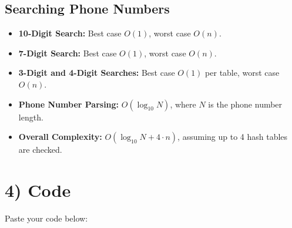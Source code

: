 \documentclass{article}
\begin{document}
\subsection*{Searching Phone Numbers}
\begin{itemize}
    \item \textbf{10-Digit Search:} Best case \(O(1)\), worst case \(O(n)\).
    \item \textbf{7-Digit Search:} Best case \(O(1)\), worst case \(O(n)\).
    \item \textbf{3-Digit and 4-Digit Searches:} Best case \(O(1)\) per table, worst case \(O(n)\).
    \item \textbf{Phone Number Parsing:} \(O(\log_{10} N)\), where \(N\) is the phone number length.
    \item \textbf{Overall Complexity:} \(O(\log_{10} N + 4 \cdot n)\), assuming up to 4 hash tables are checked.
\end{itemize}

\section*{4) Code}

Paste your code below:


\end{document}
